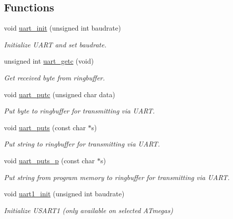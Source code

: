 \subsection*{Functions}
\begin{DoxyCompactItemize}
\item 
void \hyperlink{group__pfleury__uart_gac19a76bb7d446125734a67f9f4b68991}{uart\+\_\+init} (unsigned int baudrate)
\begin{DoxyCompactList}\small\item\em Initialize U\+A\+RT and set baudrate. \end{DoxyCompactList}\item 
unsigned int \hyperlink{group__pfleury__uart_gaefaab30a8338ec46a6be35b99b1b4f09}{uart\+\_\+getc} (void)
\begin{DoxyCompactList}\small\item\em Get received byte from ringbuffer. \end{DoxyCompactList}\item 
void \hyperlink{group__pfleury__uart_gad975221bc08b901e4c7ad69f9c9a97e2}{uart\+\_\+putc} (unsigned char data)
\begin{DoxyCompactList}\small\item\em Put byte to ringbuffer for transmitting via U\+A\+RT. \end{DoxyCompactList}\item 
void \hyperlink{group__pfleury__uart_gae52facc0a56086a365bb0018160d8d71}{uart\+\_\+puts} (const char $\ast$s)
\begin{DoxyCompactList}\small\item\em Put string to ringbuffer for transmitting via U\+A\+RT. \end{DoxyCompactList}\item 
void \hyperlink{group__pfleury__uart_ga6d78b6744db6232f52b4616402036c2f}{uart\+\_\+puts\+\_\+p} (const char $\ast$s)
\begin{DoxyCompactList}\small\item\em Put string from program memory to ringbuffer for transmitting via U\+A\+RT. \end{DoxyCompactList}\item 
void \hyperlink{group__pfleury__uart_ga4db697cb5469fd70e794fa7df73a6d6a}{uart1\+\_\+init} (unsigned int baudrate)
\begin{DoxyCompactList}\small\item\em Initialize U\+S\+A\+R\+T1 (only available on selected A\+Tmegas) \end{DoxyCompactList}\item 

\end{DoxyCompactItemize}

